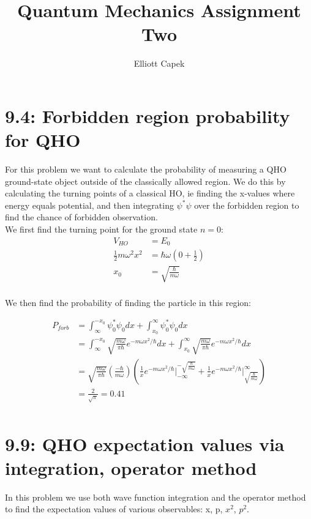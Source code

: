 \documentclass[10pt]{article} %
\title{Quantum Mechanics Assignment Two}
\author{Elliott Capek}
\begin{document}
\maketitle{}

\section{9.4: Forbidden region probability for QHO}
For this problem we want to calculate the probability of measuring a QHO ground-state object outside
of the classically allowed region. We do this by calculating the turning points of a classical HO,
ie finding the x-values where energy equals potential, and then integrating $\psi^*\psi$ over the
forbidden region to find the chance of forbidden observation.\\

We first find the turning point for the ground state $n=0$:
\begin{align*}
  V_{HO} &= E_0\\
  \frac{1}{2}m\omega^2x^2 &= \hbar\omega\left(0+\frac{1}{2}\right)\\
  x_0 &= \sqrt{\frac{\hbar}{m\omega}}\\
\end{align*}

We then find the probability of finding the particle in this region:

\begin{align*}
  P_{forb} &= \int_{\infty}^{-x_0} \psi_0^*\psi_0 dx + \int_{x_0}^{\infty} \psi_0^*\psi_0 dx\\
  &= \int_{\infty}^{-x_0} \sqrt{\frac{m\omega}{\pi\hbar}}e^{-m\omega x^2 / \hbar}dx
  + \int_{x_0}^{\infty} \sqrt{\frac{m\omega}{\pi\hbar}}e^{-m\omega x^2 / \hbar} dx\\
  &= \sqrt{\frac{m\omega}{\pi\hbar}} \left(\frac{-\hbar}{m\omega}\right)\left(
    \frac{1}{x}e^{-m\omega x^2 / \hbar} \Bigg|_{-\infty}^{-\sqrt{\frac{\hbar}{m\omega}}} +
    \frac{1}{x}e^{-m\omega x^2 / \hbar} \Bigg|_{\sqrt{\frac{\hbar}{m\omega}}}^{\infty}\right)\\
  &= \frac{2}{\sqrt{\pi}} = 0.41\\
\end{align*}

\section{9.9: QHO expectation values via integration, operator method}
In this problem we use both wave function integration and the operator method to find the
expectation values of various observables: x, p, $x^2$, $p^2$.
\end{document}
